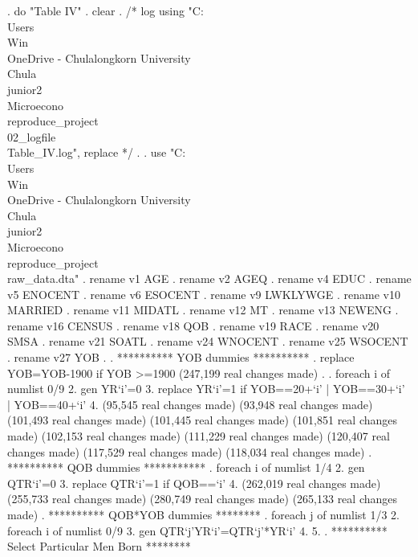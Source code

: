 . do "Table IV"
{\smallskip}
. clear
{\smallskip}
. /* log using "C:\\Users\\Win\\OneDrive - Chulalongkorn University\\Chula\\junior2\\Microecono\\reproduce_project\\02_logfile\\Table_IV.log", replace  */
. 
. use "C:\\Users\\Win\\OneDrive - Chulalongkorn University\\Chula\\junior2\\Microecono\\reproduce_project\\raw_data.dta"
{\smallskip}
. rename v1 AGE
{\smallskip}
. rename v2 AGEQ
{\smallskip}
. rename v4 EDUC
{\smallskip}
. rename v5 ENOCENT
{\smallskip}
. rename v6 ESOCENT
{\smallskip}
. rename v9 LWKLYWGE
{\smallskip}
. rename v10 MARRIED
{\smallskip}
. rename v11 MIDATL
{\smallskip}
. rename v12 MT
{\smallskip}
. rename v13 NEWENG
{\smallskip}
. rename v16 CENSUS
{\smallskip}
. rename v18 QOB
{\smallskip}
. rename v19 RACE
{\smallskip}
. rename v20 SMSA
{\smallskip}
. rename v21 SOATL
{\smallskip}
. rename v24 WNOCENT
{\smallskip}
. rename v25 WSOCENT
{\smallskip}
. rename v27 YOB
{\smallskip}
. 
. **********  YOB dummies **********
. replace YOB=YOB-1900 if YOB >=1900
(247,199 real changes made)
{\smallskip}
. 
. foreach i of numlist 0/9 {\lbr}
  2. gen YR`i'=0
  3. replace YR`i'=1 if YOB==20+`i' | YOB==30+`i' | YOB==40+`i' 
  4. {\rbr}
(95,545 real changes made)
(93,948 real changes made)
(101,493 real changes made)
(101,445 real changes made)
(101,851 real changes made)
(102,153 real changes made)
(111,229 real changes made)
(120,407 real changes made)
(117,529 real changes made)
(118,034 real changes made)
{\smallskip}
. **********  QOB dummies ***********
. foreach i of numlist 1/4 {\lbr}
  2. gen QTR`i'=0
  3. replace QTR`i'=1 if QOB==`i'
  4. {\rbr}
(262,019 real changes made)
(255,733 real changes made)
(280,749 real changes made)
(265,133 real changes made)
{\smallskip}
. **********  QOB*YOB dummies ********
. foreach j of numlist 1/3 {\lbr}
  2. foreach i of numlist 0/9 {\lbr}
  3. gen QTR`j'YR`i'=QTR`j'*YR`i'
  4. {\rbr}
  5. {\rbr}
{\smallskip}
. **********  Select Particular Men Born ********
